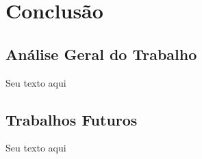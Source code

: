 \chapter{\textbf{Conclusão}} %

\section{Análise Geral do Trabalho}
 Seu texto aqui

\section{Trabalhos Futuros}
Seu texto aqui

